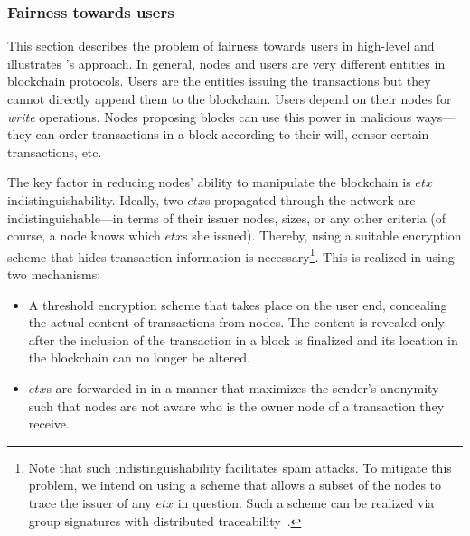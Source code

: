 \subsubsection*{Fairness towards users}
This section describes the problem of fairness towards users in high-level and illustrates \nameNS's approach. 
In general, nodes and users are very different entities in blockchain protocols. Users are the entities issuing the transactions but they cannot directly append them to the blockchain. Users depend on their nodes for \emph{write} operations. Nodes proposing blocks can use this power in malicious ways---they can order transactions in a block according to their will, censor certain transactions, etc. 

The key factor in reducing nodes' ability to manipulate the blockchain is $etx$ indistinguishability. Ideally, two $etx$s propagated through the network are indistinguishable---in terms of their issuer nodes, sizes, or any other criteria (of course, a node knows which $etx$s she issued). Thereby, using a suitable encryption scheme that hides transaction information is necessary\footnote{Note that such indistinguishability facilitates spam attacks. To mitigate this problem, we intend on using a scheme that allows a subset of the nodes to trace the issuer of any $etx$ in question. Such a scheme can be realized via group signatures with distributed traceability~\cite{SignaturesWithDistributedTraceability,SignaturesWithThresholdTraceability}.}. This is realized in \name using two mechanisms:
\begin{itemize}
\item A threshold encryption scheme that takes place on the user end, concealing the actual content of transactions from nodes. The content is revealed only after the inclusion of the transaction in a block is finalized and its location in the blockchain can no longer be altered.
\item $etx$s are forwarded in \name in a manner that maximizes the sender's anonymity such that nodes are not aware who is the owner node of a transaction they receive.
\end{itemize}

